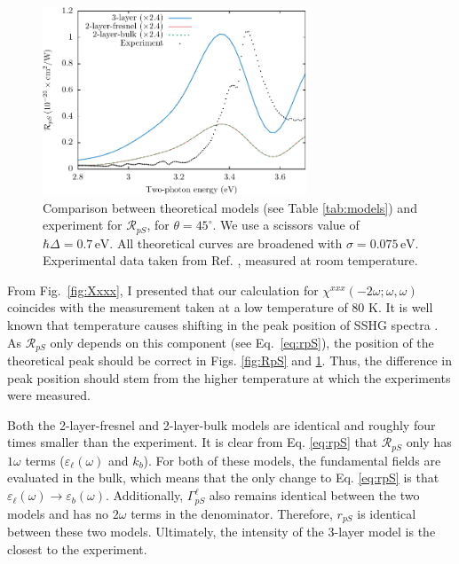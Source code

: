 \begin{figure}
\centering
\includegraphics[width=0.7\textwidth]{content/figures/fig-4_4_02}
\caption{Comparison between theoretical models (see Table
\ref{tab:models}) and experiment for $\mathcal{R}_{pS}$, for $\theta=45^\circ$.
We use a scissors value of $\hbar\Delta = 0.7\,\text{eV}$. All theoretical
curves are broadened with $\sigma=0.075\,\text{eV}$. Experimental data taken
from Ref. \cite{mitchellSS01}, measured at room temperature.}
\label{fig:mitchellRpS}
\end{figure}

From Fig.~\ref{fig:Xxxx}, I presented that our calculation for
$\chi^{xxx}(-2\omega;\omega,\omega)$ coincides with the measurement taken at a
low temperature of 80 K. It is well known that temperature causes shifting in
the peak position of SSHG spectra \cite{dadapPRB97}. As $\mathcal{R}_{pS}$ only
depends on this component (see Eq.~\eqref{eq:rpS}), the position of the
theoretical peak should be correct in Figs. \ref{fig:RpS} and
\ref{fig:mitchellRpS}. Thus, the difference in peak position should stem from
the higher temperature at which the experiments were measured.

Both the 2-layer-fresnel and 2-layer-bulk models are identical and roughly four
times smaller than the experiment. It is clear from Eq. \eqref{eq:rpS} that
$\mathcal{R}_{pS}$ only has $1\omega$ terms ($\varepsilon_{\ell}(\omega)$ and
$k_{b}$). For both of these models, the fundamental fields are evaluated in the
bulk, which means that the only change to Eq. \eqref{eq:rpS} is that
$\varepsilon_{\ell}(\omega) \rightarrow \varepsilon_{b}(\omega)$. Additionally,
$\Gamma^{\ell}_{pS}$ also remains identical between the two models and has no
$2\omega$ terms in the denominator. Therefore, $r_{pS}$ is identical between
these two models. Ultimately, the intensity of the 3-layer model is the closest
to the experiment.

